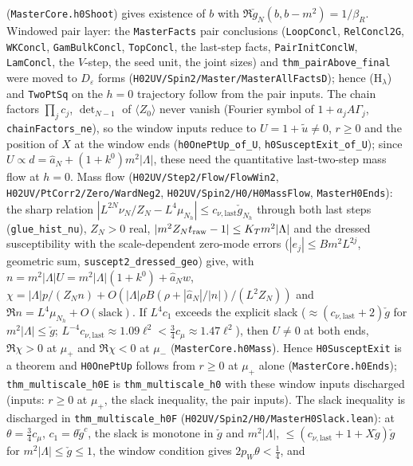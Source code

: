 \documentclass[11pt]{amsart}
\theoremstyle{definition}
\theoremstyle{remark}
\numberwithin{equation}{section}
\newcommand{\avg}[1]{\langle #1\rangle}
\begin{document}
(\texttt{MasterCore.h0Shoot}) gives existence of $b$ with $\Re\check g_N(b,b-m^2)=1/\beta_R$.
Windowed pair layer: the \texttt{MasterFacts} pair conclusions (\texttt{LoopConcl}, \texttt{RelConcl2G}, \texttt{WKConcl},
\texttt{GamBulkConcl}, \texttt{TopConcl}, the last-step facts, \texttt{PairInitConclW}, \texttt{LamConcl}, the $V$-step, the seed unit,
the joint sizes) and \texttt{thm\_pairAbove\_final} were moved to $D_\varepsilon$ forms (\texttt{H02UV/Spin2/Master/MasterAllFactsD}); hence (H$_\lambda$)
and \texttt{TwoPtSq} on the $h=0$ trajectory follow from the pair inputs. The chain factors $\prod_jc_j$, $\det_{N-1}$ of $\avg{Z_0}$
never vanish (Fourier symbol of $1+a_jA\Gamma_j$, \texttt{chainFactors\_ne}), so the window inputs reduce to $U=1+\tilde u\ne0$, $r\ge0$
and the position of $X$ at the window ends (\texttt{h0OnePtUp\_of\_U}, \texttt{h0SusceptExit\_of\_U}); since $U\propto d=\hat a_N+(1+k^0)m^2|\Lambda|$,
these need the quantitative last-two-step mass flow at $h=0$.
Mass flow (\texttt{H02UV/Step2/Flow/FlowWin2}, \texttt{H02UV/PtCorr2/Zero/WardNeg2}, \texttt{H02UV/Spin2/H0/H0MassFlow}, \texttt{MasterH0Ends}): the sharp
relation $|L^{2N}\nu_N/Z_N-L^4\mu_{N_h}|\le c_{\nu,\mathrm{last}}\check g_{N_h}$ through both last steps (\texttt{glue\_hist\_nu}),
$Z_N>0$ real, $|m^2Z_Nt_{\rm raw}-1|\le K_Tm^2|\Lambda|$ and the dressed susceptibility with the scale-dependent zero-mode
errors ($|e_j|\le Bm^2L^{2j}$, geometric sum, \texttt{suscept2\_dressed\_geo}) give, with $n=m^2|\Lambda|U=m^2|\Lambda|(1+k^0)+\hat a_Nw$,
$\chi=|\Lambda|p/(Z_Nn)+O(|\Lambda|\rho B(\rho+|\hat a_N|/|n|)/(L^2Z_N))$ and $\Re n=L^4\mu_{N_h}+O(\text{slack})$. If
$L^4c_1$ exceeds the explicit slack ($\approx(c_{\nu,\mathrm{last}}+2)\check g$ for $m^2|\Lambda|\le\check g$; $L^{-4}c_{\nu,\mathrm{last}}\approx1.09\ell^2<\frac34c_\mu\approx1.47\ell^2$),
then $U\ne0$ at both ends, $\Re\chi>0$ at $\mu_+$ and $\Re\chi<0$ at $\mu_-$ (\texttt{MasterCore.h0Mass}). Hence
\texttt{H0SusceptExit} is a theorem and \texttt{H0OnePtUp} follows from $r\ge0$ at $\mu_+$ alone (\texttt{MasterCore.h0Ends});
\texttt{thm\_multiscale\_h0E} is \texttt{thm\_multiscale\_h0} with these window inputs discharged (inputs: $r\ge0$ at $\mu_+$, the
slack inequality, the pair inputs). The slack inequality is discharged in \texttt{thm\_multiscale\_h0F}
(\texttt{H02UV/Spin2/H0/MasterH0Slack.lean}): at $\theta=\frac34c_\mu$, $c_1=\theta\check g^c$, the slack is monotone in $\check g$ and $m^2|\Lambda|$,
$\le(c_{\nu,\mathrm{last}}+1+X\check g)\check g$ for $m^2|\Lambda|\le\check g\le1$, the window condition gives $2p_W\theta<\frac14$, and
\end{document}
